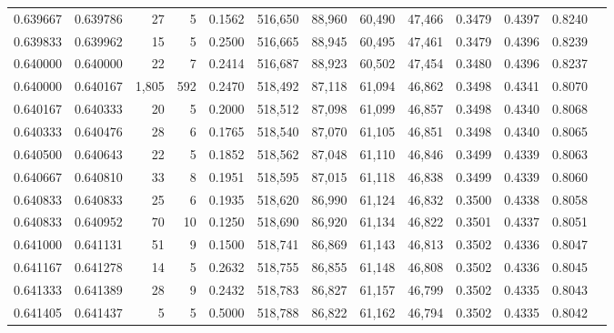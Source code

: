 \begin{tabular}{rrrrrrrrrrrrr}
0.639667 & 0.639786 &    27 &   5 &                                     0.1562 & 516,650 &  88,960 &  60,490 &  47,466 & 0.3479 & 0.4397 & 0.8240 \\
0.639833 & 0.639962 &    15 &   5 &                                     0.2500 & 516,665 &  88,945 &  60,495 &  47,461 & 0.3479 & 0.4396 & 0.8239 \\
0.640000 & 0.640000 &    22 &   7 &                                     0.2414 & 516,687 &  88,923 &  60,502 &  47,454 & 0.3480 & 0.4396 & 0.8237 \\
0.640000 & 0.640167 & 1,805 & 592 &                                     0.2470 & 518,492 &  87,118 &  61,094 &  46,862 & 0.3498 & 0.4341 & 0.8070 \\
0.640167 & 0.640333 &    20 &   5 &                                     0.2000 & 518,512 &  87,098 &  61,099 &  46,857 & 0.3498 & 0.4340 & 0.8068 \\
0.640333 & 0.640476 &    28 &   6 &                                     0.1765 & 518,540 &  87,070 &  61,105 &  46,851 & 0.3498 & 0.4340 & 0.8065 \\
0.640500 & 0.640643 &    22 &   5 &                                     0.1852 & 518,562 &  87,048 &  61,110 &  46,846 & 0.3499 & 0.4339 & 0.8063 \\
0.640667 & 0.640810 &    33 &   8 &                                     0.1951 & 518,595 &  87,015 &  61,118 &  46,838 & 0.3499 & 0.4339 & 0.8060 \\
0.640833 & 0.640833 &    25 &   6 &                                     0.1935 & 518,620 &  86,990 &  61,124 &  46,832 & 0.3500 & 0.4338 & 0.8058 \\
0.640833 & 0.640952 &    70 &  10 &                                     0.1250 & 518,690 &  86,920 &  61,134 &  46,822 & 0.3501 & 0.4337 & 0.8051 \\
0.641000 & 0.641131 &    51 &   9 &                                     0.1500 & 518,741 &  86,869 &  61,143 &  46,813 & 0.3502 & 0.4336 & 0.8047 \\
0.641167 & 0.641278 &    14 &   5 &                                     0.2632 & 518,755 &  86,855 &  61,148 &  46,808 & 0.3502 & 0.4336 & 0.8045 \\
0.641333 & 0.641389 &    28 &   9 &                                     0.2432 & 518,783 &  86,827 &  61,157 &  46,799 & 0.3502 & 0.4335 & 0.8043 \\
0.641405 & 0.641437 &     5 &   5 &                                     0.5000 & 518,788 &  86,822 &  61,162 &  46,794 & 0.3502 & 0.4335 & 0.8042 \\

\end{tabular}
